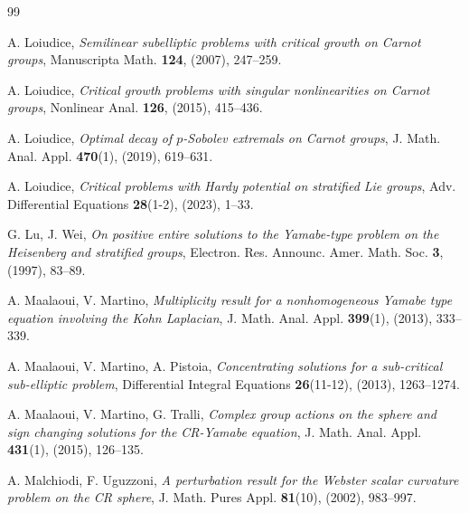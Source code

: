 \documentclass[11pt]{amsart}
\numberwithin{equation}{section} %
\theoremstyle{definition}
\begin{document}
\begin{thebibliography}{99}
	
	A. Loiudice,
	{\em Semilinear subelliptic problems with critical growth
		on Carnot groups}, Manuscripta Math. {\bf 124}, (2007), 247--259.
	
	
	A. Loiudice,
	{\em Critical growth problems with singular nonlinearities on Carnot groups},
	Nonlinear Anal. {\bf 126}, (2015), 415--436.
	
	A. Loiudice,
	{\em Optimal decay of $p$-Sobolev extremals on Carnot groups},
	J. Math. Anal. Appl. {\bf 470}(1), (2019), 619--631.
	
	A. Loiudice,
	{\em Critical problems with Hardy potential on stratified Lie groups},
	Adv. Differential Equations {\bf 28}(1-2), (2023), 1--33.
	
	G. Lu, J. Wei, 
	{\em On positive entire solutions to the Yamabe-type problem on the Heisenberg and stratified
		groups}, 
	Electron. Res. Announc. Amer. Math. Soc. {\bf 3}, (1997), 83--89.
	
	
	A. Maalaoui, V. Martino,
	{\em Multiplicity result for a nonhomogeneous Yamabe type equation involving the Kohn Laplacian},
	J. Math. Anal. Appl. {\bf 399}(1), (2013), 333--339.
	
	A. Maalaoui, V. Martino, A. Pistoia, 
	{\em Concentrating solutions for a sub-critical sub-elliptic problem},
	Differential Integral Equations {\bf 26}(11-12), (2013), 1263--1274.	
	
	A. Maalaoui, V. Martino, G. Tralli,
	{\em Complex group actions on the sphere and sign changing solutions for the CR-Yamabe equation},
	J. Math. Anal. Appl. {\bf 431}(1), (2015), 126--135.
	
	A. Malchiodi, F. Uguzzoni, 
	{\em A perturbation result for the Webster scalar curvature problem on the CR sphere},
	J. Math. Pures Appl. {\bf 81}(10), (2002), 983--997.
	
	

\end{thebibliography}
\end{document}

